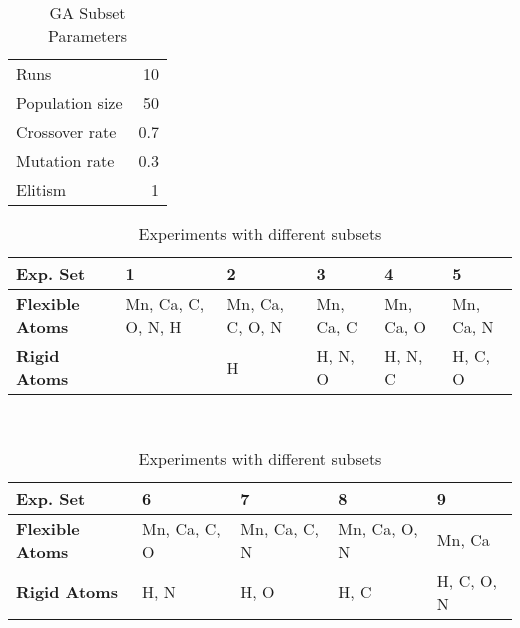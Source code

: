 \begin{table}
	\centering
	\begin{tabular}{ l r }
		\hline
		Runs & 10 \\
		Population size & 50 \\
		Crossover rate & 0.7 \\
		Mutation rate & 0.3 \\
		Elitism & 1 \\
		\hline
	\end{tabular}
	\caption{GA Subset Parameters}
	\label{table:subset-parameters}
\end{table}

\begin{table}
	\centering
	\begin{tabular}{ | >{\bfseries}p{2cm} | p{1cm} | p{1cm} | p{1cm} | p{1cm} | p{1cm} | }
		\hline
		Exp. Set & 1 & 2 & 3 & 4 & 5 \\ \hline
		Flexible Atoms & Mn, Ca, C, O, N, H & Mn, Ca, C, O, N & Mn, Ca, C & Mn, Ca, O & Mn, Ca, N \\ \hline
		Rigid Atoms &  & H & H, N, O & H, N, C & H, C, O \\ \hline
	\end{tabular}
	\\
	\vspace{3 mm}
	\begin{tabular}{ | >{\bfseries}p{2cm} | p{1cm} | p{1cm} | p{1cm} | p{1cm} | }
		\hline
		Exp. Set & 6 & 7 & 8 & 9 \\ \hline
		Flexible Atoms & Mn, Ca, C, O & Mn, Ca, C, N & Mn, Ca, O, N & Mn, Ca \\ \hline
		Rigid Atoms & H, N & H, O & H, C & H, C, O, N \\ \hline
	\end{tabular}
	\caption{Experiments with different subsets}
	\label{table:subset-setup}
\end{table}